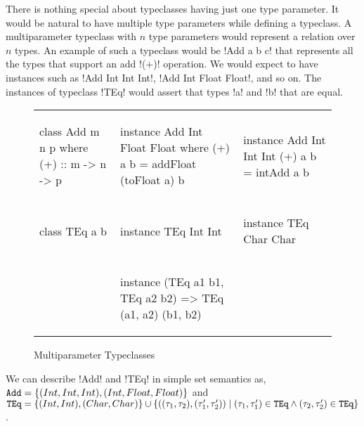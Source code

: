 \documentclass[format=sigplan,manuscript,review,screen,nonacm,margin=1in]{acmart}
\begin{document}

There is nothing special about typeclasses having just one type parameter. 
It would be natural to have multiple type parameters while defining a typeclass.
A multiparameter typeclass with $n$ type parameters would represent a relation over $n$ types.
An example of such a typeclass would be !Add a b c! that represents
all the types that support an add !(+)! operation. We would expect to have instances such as !Add Int Int Int!, 
!Add Int Float Float!, and so on. The instances of typeclass !TEq! would assert that types !a! and !b! that are equal.
\begin{figure}[ht]
  \begin{tabular}{l l l}
\begin{code}
class Add m n p where
  (+) :: m -> n -> p
\end{code}&%
\begin{code}
instance Add Int Float Float where
  (+) a b = addFloat (toFloat a) b
\end{code}&%
\begin{code}
instance Add Int Int Int
  (+) a b = intAdd a b
\end{code}\\
\begin{code}
class TEq a b
\end{code}&%
\begin{code}
instance TEq Int Int
\end{code}&%
\begin{code}
instance TEq Char Char
\end{code}\\
          &
\begin{code}
instance (TEq a1 b1, TEq a2 b2)
  => TEq (a1, a2) (b1, b2)
\end{code}
          &                
  \end{tabular}
  \caption{Multiparameter Typeclasses}
  \label{fig:multip-typeclass}
\end{figure}
We can describe !Add! and !TEq! in simple set semantics as, $\texttt{Add} = \{(Int, Int, Int), (Int, Float, Float)\}$
and $\texttt{TEq} = \{(Int, Int),(Char, Char)\} \cup \{((\tau_1, \tau_2) , (\tau'_1,\tau'_2)) \mid (\tau_1, \tau'_1)\in \texttt{TEq} \land (\tau_2, \tau'_2)\in \texttt{TEq}\}$.
\end{document}
